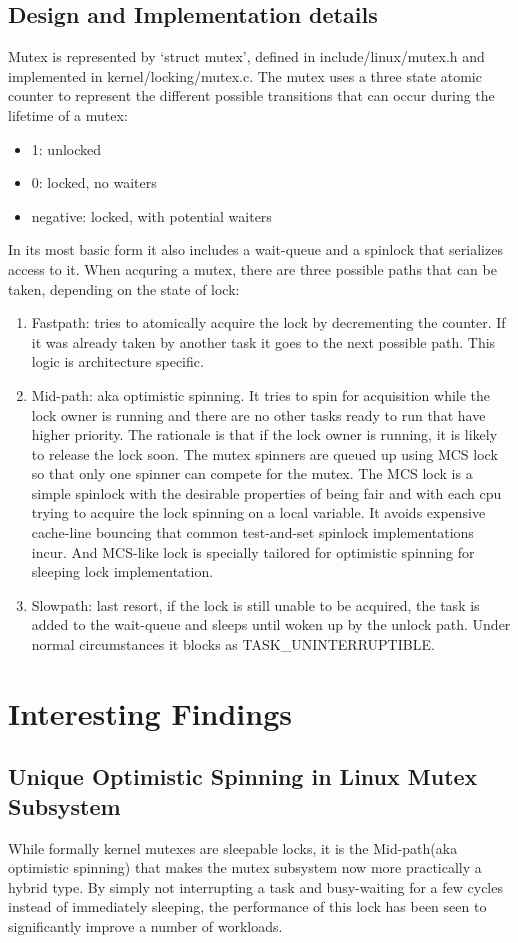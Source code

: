 \documentclass[10pt,preprint]{sigplanconf}
\begin{document}
\subsection{Design and Implementation details}
Mutex is represented by ‘struct mutex’, defined in include/linux/mutex.h and implemented in kernel/locking/mutex.c. The mutex uses a three state atomic counter to represent the different possible transitions that can occur during the lifetime of a mutex:
\begin{itemize}
	\item 1: unlocked
	\item 0: locked, no waiters
	\item negative: locked, with potential waiters
\end{itemize}
In its most basic form it also includes a wait-queue and a spinlock that serializes access to it. When acquring a mutex, there are three possible paths that can be taken, depending on the state of lock:
\begin{enumerate}
	\item Fastpath: tries to atomically acquire the lock by decrementing the counter. If it was already taken by another task it goes to the next possible path. This logic is architecture specific.
	\item Mid-path: aka optimistic spinning. It tries to spin for acquisition while the lock owner is running and there are no other tasks ready to run that have higher priority. The rationale is that if the lock owner is running, it is likely to release the lock soon. The mutex spinners are queued up using MCS lock so that only one spinner can compete for the mutex. The MCS lock is a simple spinlock with the desirable properties of being fair and with each cpu trying to acquire the lock spinning on a local variable. It avoids expensive cache-line bouncing that common test-and-set spinlock implementations incur. And MCS-like lock is specially tailored for optimistic spinning for sleeping lock implementation.
	\item Slowpath: last resort, if the lock is still unable to be acquired, the task is added to the wait-queue and sleeps until woken up by the unlock path. Under normal circumstances it blocks as TASK\_UNINTERRUPTIBLE.
\end{enumerate}

\section{Interesting Findings}
\subsection{Unique Optimistic Spinning in Linux Mutex Subsystem}
While formally kernel mutexes are sleepable locks, it is the Mid-path(aka optimistic spinning) that makes the mutex subsystem now more practically a hybrid type. By simply not interrupting a task and busy-waiting for a few cycles instead of immediately sleeping, the performance of this lock has been seen to significantly improve a number of workloads. \\
\end{document}
